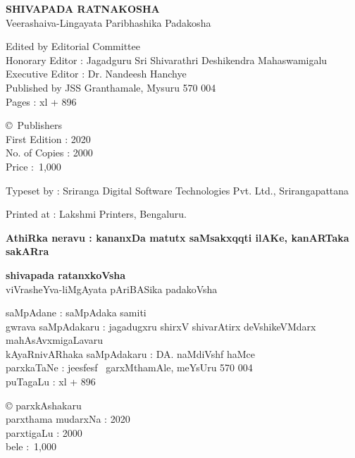 \thispagestyle{empty}
\noindent
{\rm\sf\bfseries SHIVAPADA RATNAKOSHA}\\[3pt]
{\rm Veerashaiva-Lingayata Paribhashika Padakosha} 

\medskip

\noindent
{\rm Edited by Editorial Committee}\\
{\rm Honorary Editor : Jagadguru Sri Shivarathri Deshikendra Mahaswamigalu}\\
{\rm Executive Editor : Dr. Nandeesh Hanchye}\\
{\rm Published by JSS Granthamale, Mysuru 570 004}\\[8pt]
{\rm Pages : xl + 896}

\vspace{1cm}

\noindent
{\rm \copyright \ Publishers}\\[7pt]
{\rm First Edition : 2020}\\[7pt]
{\rm No. of Copies : 2000}\\[7pt]
{\rm Price : \rupee\,1,000}

\bigskip

\noindent
{\rm Typeset by : Sriranga Digital Software Technologies Pvt. Ltd., Srirangapattana}

\medskip

\noindent
{\rm Printed at : Lakshmi Printers, Bengaluru.}

\vfill

\noindent
{\bf AthiRka neravu : kananxDa matutx saMsakxqqti ilAKe, kanARTaka sakARra}

\vskip 1cm

\noindent
{\bf\large shivapada ratanxkoVsha}\\[3pt]
viVrasheYva-liMgAyata pAriBASika padakoVsha 

\medskip

\noindent
saMpAdane : saMpAdaka samiti\\
gwrava saMpAdakaru : jagadugxru shirxV shivarAtirx deVshikeVMdarx mahAsAvxmigaLavaru\\
kAyaRnivARhaka saMpAdakaru : DA. naMdiVshf haMce\\
parxkaTaNe : je{esf}{esf} \ garxMthamAle, meYsUru 570 004\\[8pt]
puTagaLu : {\rm xl} + 896

\vspace{1cm}

\noindent
{\rm \copyright} parxkAshakaru\\[7pt]
parxthama mudarxNa : 2020\\[7pt]
parxtigaLu : 2000\\[10pt]
bele : \rupee\,1,000

